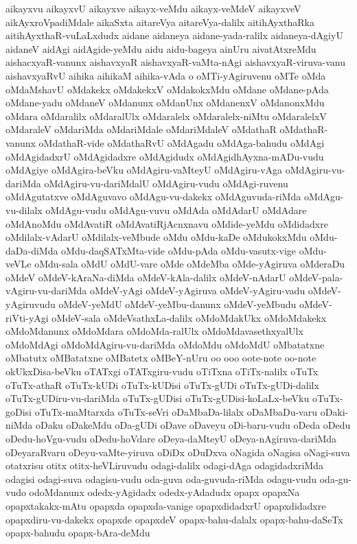 {aikayxvu
aikayxvU
aikayxve
aikayx-veMdu
aikayx-veMdeV
aikayxveV
aikAyxroVpadiMdale
aikaSxta
aitareVya
aitareVya-dalilx
aitihAyxthaRka
aitihAyxthaR-vuLaLxdudx
aidane
aidaneya
aidane-yada-ralilx
aidaneya-dAgiyU
aidaneV
aidAgi
aidAgide-yeMdu
aidu
aidu-bageya
ainUru
aivatAtxreMdu
aishacxyaR-vanunx
aishavxyaR
aishavxyaR-vaMta-nAgi
aishavxyaR-viruva-vanu
aishavxyaRvU
aihika
aihikaM
aihika-vAda
o
oMTi-yAgiruvenu
oMTe
oMda
oMdaMshavU
oMdakekx
oMdakekxV
oMdakokxMdu
oMdane
oMdane-pAda
oMdane-yadu
oMdaneV
oMdanunx
oMdanUnx
oMdanenxV
oMdanonxMdu
oMdara
oMdaralilx
oMdaralUlx
oMdaralelx
oMdaralelx-niMtu
oMdaralelxV
oMdaraleV
oMdariMda
oMdariMdale
oMdariMdaleV
oMdathaR
oMdathaR-vanunx
oMdathaR-vide
oMdathaRvU
oMdAgadu
oMdAga-bahudu
oMdAgi
oMdAgidadxrU
oMdAgidadxre
oMdAgidudx
oMdAgidhAyxna-mADu-vudu
oMdAgiye
oMdAgira-beVku
oMdAgiru-vaMteyU
oMdAgiru-vAga
oMdAgiru-vu-dariMda
oMdAgiru-vu-dariMdalU
oMdAgiru-vudu
oMdAgi-ruvenu
oMdAgutatxve
oMdAguvavo
oMdAgu-vu-dakekx
oMdAguvuda-riMda
oMdAgu-vu-dilalx
oMdAgu-vudu
oMdAgu-vuvu
oMdAda
oMdAdarU
oMdAdare
oMdAnoMdu
oMdAvatiR
oMdAvatiRjAcnxnavu
oMdide-yeMdu
oMdidadxre
oMdilalx-vAdarU
oMdilalx-veMbude
oMdu
oMdu-kaDe
oMdukokxMdu
oMdu-daDa-diMda
oMdu-daqSATxMta-vide
oMdu-pAda
oMdu-vasutx-vige
oMdu-veVLe
oMdu-sala
oMdU
oMdU-vare
oMde
oMdeMba
oMde-yAgiruva
oMderaDu
oMdeV
oMdeV-kAraNa-diMda
oMdeV-kAla-dalilx
oMdeV-nAdarU
oMdeV-pala-vAgiru-vu-dariMda
oMdeV-yAgi
oMdeV-yAgiruva
oMdeV-yAgiru-vadu
oMdeV-yAgiruvudu
oMdeV-yeMdU
oMdeV-yeMbu-danunx
oMdeV-yeMbudu
oMdeV-riVti-yAgi
oMdeV-sala
oMdeVsathxLa-dalilx
oMdoMdakUkx
oMdoMdakekx
oMdoMdanunx
oMdoMdara
oMdoMda-ralUlx
oMdoMdavasethxyalUlx
oMdoMdAgi
oMdoMdAgiru-vu-dariMda
oMdoMdu
oMdoMdU
oMbatatxne
oMbatutx
oMBatatxne
oMBatetx
oMBeY-nUru
oo
ooo
oote-note
oo-note
okUkxDisa-beVku
oTATxgi
oTATxgiru-vudu
oTiTxna
oTiTx-nalilx
oTuTx
oTuTx-athaR
oTuTx-kUDi
oTuTx-kUDisi
oTuTx-gUDi
oTuTx-gUDi-dalilx
oTuTx-gUDiru-vu-dariMda
oTuTx-gUDisi
oTuTx-gUDisi-koLaLx-beVku
oTuTx-goDisi
oTuTx-maMtarxda
oTuTx-seVri
oDaMbaDa-lilalx
oDaMbaDu-varu
oDaki-niMda
oDaku
oDakeMdu
oDa-gUDi
oDave
oDaveyu
oDi-baru-vudu
oDeda
oDedu
oDedu-hoVgu-vudu
oDedu-hoVdare
oDeya-daMteyU
oDeya-nAgiruva-dariMda
oDeyaraRvaru
oDeyu-vaMte-yiruva
oDiDx
oDuDxva
oNagida
oNagisa
oNagi-suva
otatxrisu
otitx
otitx-heVLiruvudu
odagi-dalilx
odagi-dAga
odagidadxriMda
odagisi
odagi-suva
odagisu-vudu
oda-guva
oda-guvuda-riMda
odagu-vudu
oda-gu-vudo
odoMdanunx
odedx-yAgidadx
odedx-yAdadudx
opapx
opapxNa
opapxtakakx-mAtu
opapxda
opapxda-vanige
opapxdidadxrU
opapxdidadxre
opapxdiru-vu-dakekx
opapxde
opapxdeV
opapx-bahu-dalalx
opapx-bahu-daSeTx
opapx-bahudu
opapx-bAra-deMdu
}
